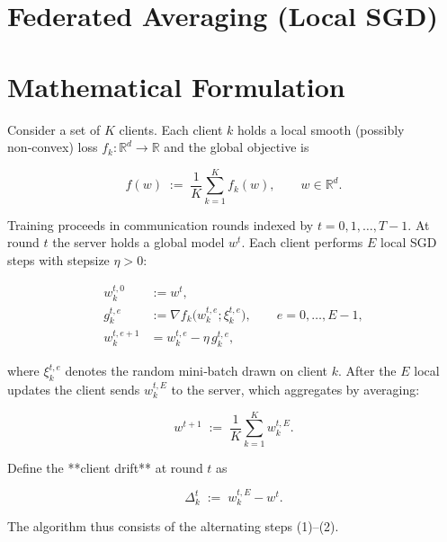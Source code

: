\documentclass{article}
\begin{document}
\section*{Federated Averaging (Local SGD)}

\section*{Mathematical Formulation}
Consider a set of $K$ clients.  
Each client $k$ holds a local smooth (possibly non‑convex) loss 
$f_k:\mathbb{R}^d\!\to\!\mathbb{R}$ and the global objective is  

\[
f(w)\;:=\;\frac1K\sum_{k=1}^{K} f_k(w),\qquad w\in\mathbb{R}^d .
\]

Training proceeds in communication rounds indexed by $t=0,1,\dots,T-1$.
At round $t$ the server holds a global model $w^{t}$.
Each client performs $E$ local SGD steps with stepsize $\eta>0$:

\[
\begin{aligned}
w_{k}^{t,0} &:= w^{t},\\
g_{k}^{t,e} &:= \nabla f_k\!\bigl(w_{k}^{t,e};\xi_{k}^{t,e}\bigr),\qquad e=0,\dots,E-1,\\
w_{k}^{t,e+1} &= w_{k}^{t,e} - \eta\, g_{k}^{t,e},
\end{aligned}
\tag{1}
\]

where $\xi_{k}^{t,e}$ denotes the random mini‑batch drawn on client $k$.
After the $E$ local updates the client sends $w_{k}^{t,E}$ to the server,
which aggregates by averaging:

\[
w^{t+1}\;:=\;\frac1K\sum_{k=1}^{K} w_{k}^{t,E}.
\tag{2}
\]

Define the **client drift** at round $t$ as  

\[
\Delta_{k}^{t}\;:=\;w_{k}^{t,E}-w^{t}.
\tag{3}
\]

The algorithm thus consists of the alternating steps (1)–(2).  
\end{document}
